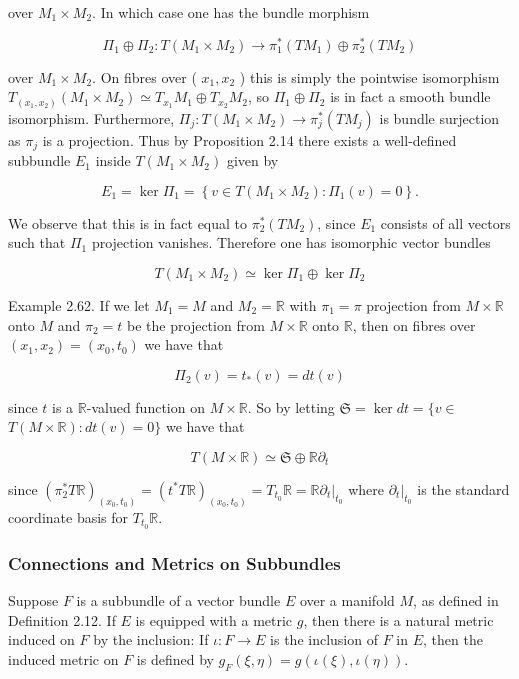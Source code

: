 \documentclass[10pt, letterpaper]{article}
\begin{document}
over $M_{1} \times M_{2}$. In which case one has the bundle morphism

$$
\Pi_{1} \oplus \Pi_{2}: T\left(M_{1} \times M_{2}\right) \rightarrow \pi_{1}^{*}\left(T M_{1}\right) \oplus \pi_{2}^{*}\left(T M_{2}\right)
$$

over $M_{1} \times M_{2}$. On fibres over ( $x_{1}, x_{2}$ ) this is simply the pointwise isomorphism $T_{\left(x_{1}, x_{2}\right)}\left(M_{1} \times M_{2}\right) \simeq T_{x_{1}} M_{1} \oplus T_{x_{2}} M_{2}$, so $\Pi_{1} \oplus \Pi_{2}$ is in fact a smooth bundle isomorphism. Furthermore, $\Pi_{j}: T\left(M_{1} \times M_{2}\right) \rightarrow \pi_{j}^{*}\left(T M_{j}\right)$ is bundle surjection as $\pi_{j}$ is a projection. Thus by Proposition 2.14 there exists a well-defined subbundle $E_{1}$ inside $T\left(M_{1} \times M_{2}\right)$ given by

$$
E_{1}=\operatorname{ker} \Pi_{1}=\left\{v \in T\left(M_{1} \times M_{2}\right): \Pi_{1}(v)=0\right\} .
$$

We observe that this is in fact equal to $\pi_{2}^{*}\left(T M_{2}\right)$, since $E_{1}$ consists of all vectors such that $\Pi_{1}$ projection vanishes. Therefore one has isomorphic vector bundles

$$
T\left(M_{1} \times M_{2}\right) \simeq \operatorname{ker} \Pi_{1} \oplus \operatorname{ker} \Pi_{2}
$$

Example 2.62. If we let $M_{1}=M$ and $M_{2}=\mathbb{R}$ with $\pi_{1}=\pi$ projection from $M \times \mathbb{R}$ onto $M$ and $\pi_{2}=t$ be the projection from $M \times \mathbb{R}$ onto $\mathbb{R}$, then on fibres over $\left(x_{1}, x_{2}\right)=\left(x_{0}, t_{0}\right)$ we have that

$$
\Pi_{2}(v)=t_{*}(v)=d t(v)
$$

since $t$ is a $\mathbb{R}$-valued function on $M \times \mathbb{R}$. So by letting $\mathfrak{S}=\operatorname{ker} d t=\{v \in$ $T(M \times \mathbb{R}): d t(v)=0\}$ we have that

$$
T(M \times \mathbb{R}) \simeq \mathfrak{S} \oplus \mathbb{R} \partial_{t}
$$

since $\left(\pi_{2}^{*} T \mathbb{R}\right)_{\left(x_{0}, t_{0}\right)}=\left(t^{*} T \mathbb{R}\right)_{\left(x_{0}, t_{0}\right)}=T_{t_{0}} \mathbb{R}=\left.\mathbb{R} \partial_{t}\right|_{t_{0}}$ where $\left.\partial_{t}\right|_{t_{0}}$ is the standard coordinate basis for $T_{t_{0}} \mathbb{R}$.

\subsubsection*{Connections and Metrics on Subbundles}
Suppose $F$ is a subbundle of a vector bundle $E$ over a manifold $M$, as defined in Definition 2.12. If $E$ is equipped with a metric $g$, then there is a natural metric induced on $F$ by the inclusion: If $\iota: F \rightarrow E$ is the inclusion of $F$ in $E$, then the induced metric on $F$ is defined by $g_{F}(\xi, \eta)=g(\iota(\xi), \iota(\eta))$.
\end{document}
